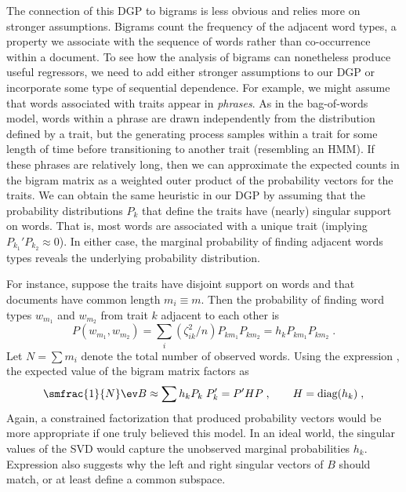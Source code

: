 \documentclass[12pt]{article}
\begin{document}
The connection of this DGP to bigrams is less obvious and relies more on stronger assumptions.  Bigrams count the frequency of the adjacent word types, a property we associate with the sequence of words rather than co-occurrence within a document.  To see how the analysis of bigrams can nonetheless produce useful regressors, we need to add either stronger assumptions to our DGP or incorporate some type of sequential dependence.  For example, we might assume that words associated with traits appear in {\em phrases}.   As in the bag-of-words model, words within a phrase are drawn independently from the distribution defined by a trait, but the generating process samples within a trait for some length of time before transitioning to another trait (resembling an HMM).  If these phrases are relatively long, then we can approximate the expected counts in the bigram matrix as a weighted outer product of the probability vectors for the traits.  We can obtain the same heuristic in our DGP by assuming that the probability distributions $P_k$ that define the traits have (nearly) singular support on words.  That is, most words are associated with a unique trait (implying $P_{k_1}'P_{k_2}  \approx 0$).  In either case, the marginal probability of finding adjacent words types reveals the underlying probability distribution.  


For instance, suppose the traits have disjoint support on words and that documents have common length $m_i \equiv m$. Then the probability of finding  word types  $w_{m_1}$ and $w_{m_2}$ from trait $k$ adjacent to each other is 
 \begin{equation}
  P(w_{m_1},w_{m_2}) = \sum_i \left(\zeta_{ik}^2/n \right) P_{km_1} P_{km_2} 
                                     = h_k P_{km_1} P_{km_2}  \;.
  \label{eq:joint}
\end{equation}
Let $N = \sum m_i$ denote the total number of observed words. Using the expression , the expected value of the bigram matrix factors as
 \begin{equation}
    \smfrac{1}{N} \ev B \approx \sum h_k P_k\; P_k' = P' H P \;, 
                     \qquad  H = \mbox{diag}(h_k)\;,
 \label{eq:B2}
 \end{equation}
Again, a constrained factorization that produced probability vectors would be more appropriate if one truly believed this model.  In an ideal world, the singular values of the SVD would capture the unobserved marginal probabilities  $h_k$.  Expression  also suggests why the left and right singular vectors of $B$ should match, or at least define a common subspace.
\end{document}
